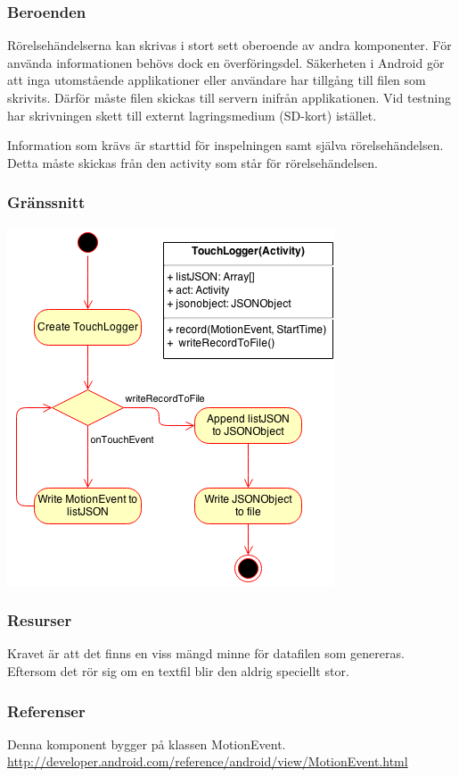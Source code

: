 \subsubsection{Beroenden}
Rörelsehändelserna kan skrivas i stort sett oberoende av andra komponenter. För använda informationen behövs dock en överföringsdel. Säkerheten i Android gör att inga utomstående applikationer eller användare har tillgång till filen som skrivits. Därför måste filen skickas till servern inifrån applikationen. Vid testning har skrivningen skett till externt lagringsmedium (SD-kort) istället.

Information som krävs är starttid för inspelningen samt själva rörelsehändelsen. Detta måste skickas från den activity som står för rörelsehändelsen.
\subsubsection{Gränssnitt}
\includegraphics[scale=0.8]{TouchLogger.png}
\subsubsection{Resurser}
Kravet är att det finns en viss mängd minne för datafilen som genereras. Eftersom det rör sig om en textfil blir den aldrig speciellt stor.
\subsubsection{Referenser}
Denna komponent bygger på klassen MotionEvent.
\url{http://developer.android.com/reference/android/view/MotionEvent.html}
